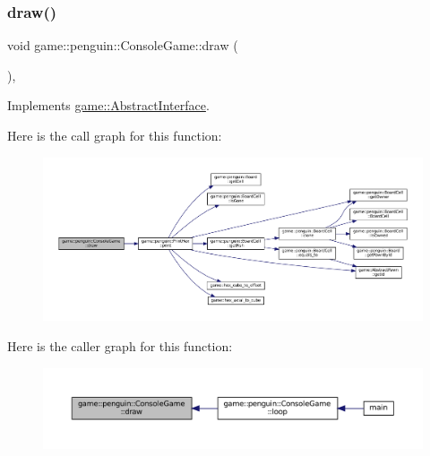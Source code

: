 \subsubsection{\texorpdfstring{draw()}{draw()}}
{\footnotesize\ttfamily void game\+::penguin\+::\+Console\+Game\+::draw (\begin{DoxyParamCaption}{ }\end{DoxyParamCaption})\hspace{0.3cm}{\ttfamily [override]}, {\ttfamily [virtual]}}



Implements \hyperlink{classgame_1_1_abstract_interface_af4330557019768a4be424165e4cf008f}{game\+::\+Abstract\+Interface}.

Here is the call graph for this function\+:
\nopagebreak
\begin{figure}[H]
\begin{center}
\leavevmode
\includegraphics[width=350pt]{classgame_1_1penguin_1_1_console_game_a71c697742201f71b29327bf8554c2ef0_cgraph}
\end{center}
\end{figure}
Here is the caller graph for this function\+:
\nopagebreak
\begin{figure}[H]
\begin{center}
\leavevmode
\includegraphics[width=350pt]{classgame_1_1penguin_1_1_console_game_a71c697742201f71b29327bf8554c2ef0_icgraph}
\end{center}
\end{figure}
\mbox{\label{classgame_1_1penguin_1_1_console_game_a56af132d8e3d16902fb46b7979d37eae}} 
